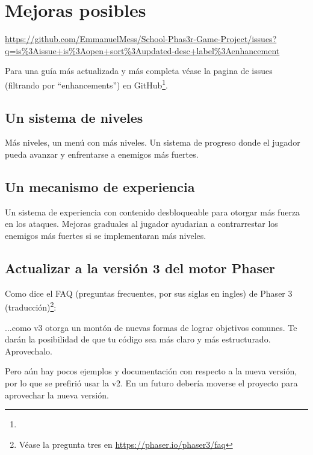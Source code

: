 \documentclass{article}
\begin{document}
   	\section*{Mejoras posibles}
   	\urldef\inserturl\url{https://github.com/EmmanuelMess/School-Phas3r-Game-Project/issues?q=is%3Aissue+is%3Aopen+sort%3Aupdated-desc+label%3Aenhancement}
   		
	Para una guía más actualizada y más completa véase la pagina de issues (filtrando por ``enhancements'') en GitHub\footnote{\inserturl}.
	
   	\subsection*{Un sistema de niveles}
	
	Más niveles, un menú con más niveles. Un sistema de progreso donde el jugador pueda avanzar y enfrentarse a enemigos más fuertes.
	
	\subsection*{Un mecanismo de experiencia}
	
	Un sistema de experiencia con contenido desbloqueable para otorgar más fuerza en los ataques. Mejoras graduales al jugador ayudarian a contrarrestar los enemigos más fuertes si se implementaran más niveles.
	
	\subsection*{Actualizar a la versión 3 del motor Phaser}
	
	Como dice el FAQ (preguntas frecuentes, por sus siglas en ingles) de Phaser 3 (traducción)\footnote{Véase la pregunta tres en \url{https://phaser.io/phaser3/faq}}:
	\begin{displayquote}
	 	...como v3 otorga un montón de nuevas formas de lograr objetivos comunes. Te darán la posibilidad de que tu código sea más claro y más estructurado. Aprovechalo.
	\end{displayquote}
	
	Pero aún hay pocos ejemplos y documentación con respecto a la nueva versión, por lo que se prefirió usar la v2. En un futuro debería moverse el proyecto para aprovechar la nueva versión.
\end{document}
